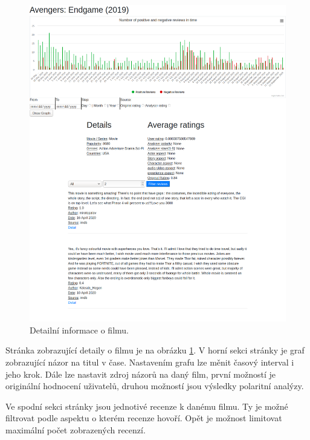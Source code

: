 \begin{figure}[!htb]
\label{movied}
\centering
\includegraphics[width=\textwidth]{movie_detail.png}
\caption{Detailní informace o filmu.}
\end{figure}
\FloatBarrier
Stránka zobrazující detaily o filmu je na obrázku \ref{movied}. V horní sekci stránky je graf zobrazující názor na titul v čase. Nastavením grafu lze měnit časový interval i jeho krok. Dále lze nastavit zdroj názorů na daný film, první možností je originální hodnocení uživatelů, druhou možností jsou výsledky polaritní analýzy.

Ve spodní sekci stránky jsou jednotivé recenze k danému filmu. Ty je možné filtrovat podle aspektu o kterém recenze hovoří. Opět je možnost limitovat maximální počet zobrazených recenzí. 


